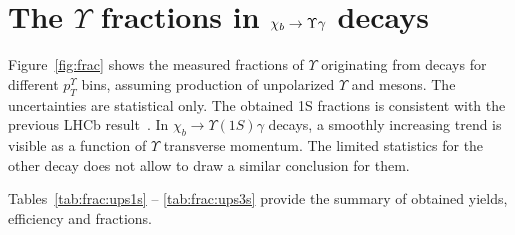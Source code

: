 \section{The \texorpdfstring{$\Upsilon$}{Y} fractions in \texorpdfstring{$\chi_{b} \rightarrow \Upsilon \gamma$}{chib --> Y gamma} decays}
\label{sec:fraction}

Figure~\ref{fig:frac} shows the measured fractions of $\Upsilon$ originating
from \chib decays for different $p_T^{\Upsilon}$ bins,  assuming production of
unpolarized $\Upsilon$ and \chib mesons. The uncertainties are statistical
only. The obtained \Y1S fractions is consistent with the previous LHCb
result~\cite{LHCb-PAPER-2012-015}. In $\chi_b \rightarrow \Upsilon(1S) \gamma$
decays, a smoothly increasing trend is visible as a function of $\Upsilon$
transverse momentum. The limited statistics for the other decay does not allow
to draw a similar conclusion for them.




Tables~\ref{tab:frac:ups1s} -- \ref{tab:frac:ups3s} provide the summary
of obtained yields, efficiency and fractions.


